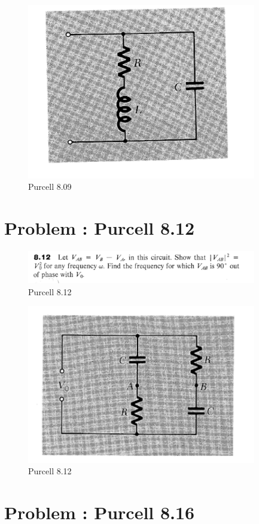 \documentclass[problems]{esg8022pset}
\begin{document}
  \begin{figure}[H]
    \centering
    \includegraphics[width = 10cm]{figpu809}
    \caption{Purcell 8.09}
  \end{figure}
\section{Problem \thesection: Purcell 8.12}

\begin{figure}[H]
    \centering
    \includegraphics[width = 10cm]{pu812}
    \caption{Purcell 8.12}
  \end{figure}

  \begin{figure}[H]
    \centering
    \includegraphics[width = 10cm]{figpu812}
    \caption{Purcell 8.12}
  \end{figure}
\section{Problem \thesection: Purcell 8.16}
\end{document}
